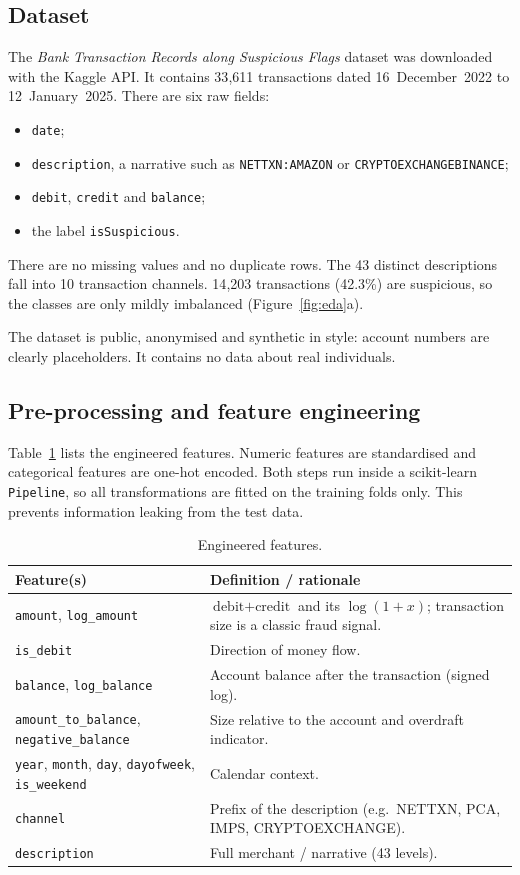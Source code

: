 \documentclass[12pt,a4paper]{article}
\begin{document}
\subsection{Dataset}
The \emph{Bank Transaction Records along Suspicious Flags} dataset \citep{kaggle2025dataset} was downloaded with the Kaggle API. It contains 33{,}611 transactions dated 16~December~2022 to 12~January~2025. There are six raw fields:
\begin{itemize}[nosep]
\item \texttt{date};
\item \texttt{description}, a narrative such as \texttt{NETTXN:AMAZON} or \texttt{CRYPTOEXCHANGEBINANCE};
\item \texttt{debit}, \texttt{credit} and \texttt{balance};
\item the label \texttt{isSuspicious}.
\end{itemize}

There are no missing values and no duplicate rows. The 43 distinct descriptions fall into 10 transaction channels. 14{,}203 transactions (42.3\%) are suspicious, so the classes are only mildly imbalanced (Figure~\ref{fig:eda}a).

The dataset is public, anonymised and synthetic in style: account numbers are clearly placeholders. It contains no data about real individuals.

\subsection{Pre-processing and feature engineering}
Table~\ref{tab:features} lists the engineered features. Numeric features are standardised and categorical features are one-hot encoded. Both steps run inside a scikit-learn \texttt{Pipeline}, so all transformations are fitted on the training folds only. This prevents information leaking from the test data.

\begin{table}[H]
\centering\small
\caption{Engineered features.}\label{tab:features}
\begin{tabular}{p{4.2cm}p{10cm}}
\toprule
Feature(s) & Definition / rationale \\
\midrule
\texttt{amount}, \texttt{log\_amount} & $\text{debit}+\text{credit}$ and its $\log(1+x)$; transaction size is a classic fraud signal. \\
\texttt{is\_debit} & Direction of money flow. \\
\texttt{balance}, \texttt{log\_balance} & Account balance after the transaction (signed log). \\
\texttt{amount\_to\_balance}, \texttt{negative\_balance} & Size relative to the account and overdraft indicator. \\
\texttt{year}, \texttt{month}, \texttt{day}, \texttt{dayofweek}, \texttt{is\_weekend} & Calendar context. \\
\texttt{channel} & Prefix of the description (e.g.\ NETTXN, PCA, IMPS, CRYPTOEXCHANGE). \\
\texttt{description} & Full merchant / narrative (43 levels). \\
\bottomrule
\end{tabular}
\end{table}
\end{document}
